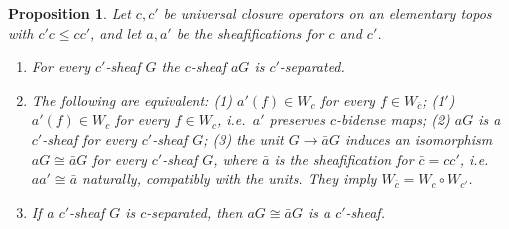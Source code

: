 \documentclass[11pt]{amsart}
\newtheorem{prop}[thm]{Proposition}
\theoremstyle{definition}
\begin{document}
\begin{prop}\label{prop:reflectors}
Let $c,c'$ be universal closure operators on an elementary topos with
$c'c\le cc'$, and let $a,a'$ be the sheafifications for $c$ and $c'$.
\begin{enumerate}
\item[(a)] For every $c'$-sheaf $G$ the $c$-sheaf $aG$ is
$c'$-separated.
\item[(b)] The following are equivalent: (1) $a'(f)\in W_c$ for every
$f\in W_{\bar c}$; (1$'$) $a'(f)\in W_c$ for every $f\in W_c$, i.e.\ $a'$
preserves $c$-bidense maps; (2) $aG$ is a $c'$-sheaf for every $c'$-sheaf $G$; (3)
the unit $G\to\bar aG$ induces an isomorphism $aG\cong\bar aG$ for
every $c'$-sheaf $G$, where $\bar a$ is the sheafification for $\bar c=
cc'$, i.e.\ $aa'\cong\bar a$ naturally, compatibly with the units. They
imply $W_{\bar c}=W_c\circ W_{c'}$.
\item[(c)] If a $c'$-sheaf $G$ is $c$-separated, then $aG\cong\bar aG$ is
a $c'$-sheaf.
\end{enumerate}
\end{prop}
\end{document}
